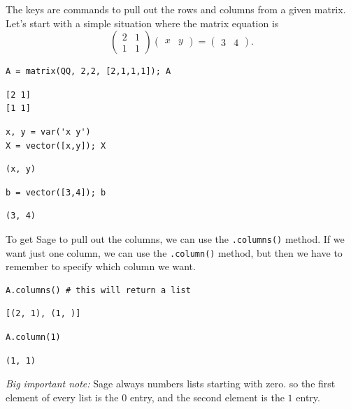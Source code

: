 \documentclass[10pt,]{book}
\theoremstyle{plain}
\numberwithin{equation}{section}
\begin{document}
      The keys are commands to pull out the rows and columns from a given matrix.
      Let's start with a simple situation where the matrix equation is
      \[
        \begin{pmatrix} 2 & 1 \\ 1 & 1 \end{pmatrix}
        \begin{pmatrix} x & y \end{pmatrix} =
        \begin{pmatrix} 3 & 4 \end{pmatrix}.
      \]
\begin{lstlisting}[style=sageinput]
A = matrix(QQ, 2,2, [2,1,1,1]); A
\end{lstlisting}
\begin{lstlisting}[style=sageoutput]
[2 1]
[1 1]
\end{lstlisting}
\begin{lstlisting}[style=sageinput]
x, y = var('x y')
X = vector([x,y]); X
\end{lstlisting}
\begin{lstlisting}[style=sageoutput]
(x, y)
\end{lstlisting}
\begin{lstlisting}[style=sageinput]
b = vector([3,4]); b
\end{lstlisting}
\begin{lstlisting}[style=sageoutput]
(3, 4)
\end{lstlisting}
\par

      To get Sage to pull out the columns, we can use the \verb?.columns()?
      method. If we want just one column, we can use the \verb?.column()? method,
      but then we have to remember to specify which column we want.
\begin{lstlisting}[style=sageinput]
A.columns() # this will return a list
\end{lstlisting}
\begin{lstlisting}[style=sageoutput]
[(2, 1), (1, )]
\end{lstlisting}
\begin{lstlisting}[style=sageinput]
A.column(1)
\end{lstlisting}
\begin{lstlisting}[style=sageoutput]
(1, 1)
\end{lstlisting}
\par

      \emph{Big important note:} Sage always numbers lists starting with zero.
      so the first element of every list is the \(0\) entry, and the second
      element is the \(1\) entry.
\par
\end{document}
